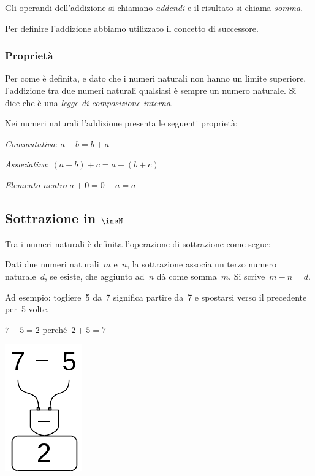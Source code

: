 Gli operandi dell'addizione si chiamano \emph{addendi} e il risultato si 
chiama \emph{somma}.

\osservazione Per definire l'addizione abbiamo utilizzato il concetto di 
successore.

\subsubsection{Proprietà}

Per come è definita, e dato che i numeri naturali non hanno un limite 
superiore, l'addizione tra due numeri  naturali qualsiasi è sempre un numero
naturale. Si dice che è una \emph{legge di composizione interna}. 

Nei numeri naturali l'addizione presenta le seguenti proprietà:

\begin{itemize*}
 \item \emph{Commutativa}: $a + b = b + a$
 \item \emph{Associativa}: $(a + b) + c = a + (b + c)$
 \item \emph{Elemento neutro} $a + 0 = 0 + a = a$
\end{itemize*}

\subsection{Sottrazione in $\insN$}

Tra i numeri naturali è definita l'operazione di sottrazione come segue:

\begin{definizione}
Dati due numeri naturali~$m$ e~$n$, la sottrazione associa un terzo numero 
naturale~$d$, se esiste, che aggiunto ad~$n$ dà come somma~$m$.
Si scrive~$m - n = d$.
\end{definizione}

Ad esempio: togliere~5 da~7 significa partire da~7 e spostarsi verso il 
precedente per~5 volte.

\begin{minipage}{0.80\textwidth}
 \centering
 $7-5=2$ perché~$2+5=7$

 
\end{minipage}%
\begin{minipage}{0.15\textwidth}
 \centering
\begin{inaccessibleblock}
 \includegraphics[scale=0.35]{img/op_sot.png}
\end{inaccessibleblock}
\end{minipage}%


